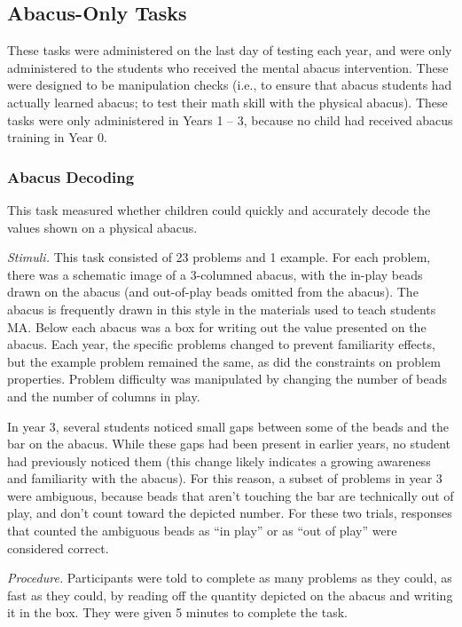 \documentclass[11pt]{article}
\begin{document}
\subsection{Abacus-Only Tasks}

These tasks were administered on the last day of testing each year, and were only administered to the students who received the mental abacus intervention. These were designed to be manipulation checks (i.e., to ensure that abacus students had actually learned abacus; to test their math skill with the physical abacus). These tasks were only administered in Years 1 -- 3, because no child had received abacus training in Year 0.
 
\subsubsection{Abacus Decoding}

This task measured whether children could quickly and accurately decode the values shown on a physical abacus.

{\it Stimuli.} This task consisted of 23 problems and 1 example. For each problem, there was a schematic image of a 3-columned abacus, with the in-play beads drawn on the abacus (and out-of-play beads omitted from the abacus). The abacus is frequently drawn in this style in the materials used to teach students MA. Below each abacus was a box for writing out the value presented on the abacus. Each year, the specific problems changed to prevent familiarity effects, but the example problem remained the same, as did the constraints on problem properties. Problem difficulty was manipulated by changing the number of beads and the number of columns in play. 

In year 3, several students noticed small gaps between some of the beads and the bar on the abacus. While these gaps had been present in earlier years, no student had previously noticed them (this change likely indicates a growing awareness and familiarity with the abacus). For this reason, a subset of problems in year 3 were ambiguous, because beads that aren't touching the bar are technically out of play, and don't count toward the depicted number. For these two trials, responses that counted the ambiguous beads as ``in play'' or as ``out of play'' were considered correct. 

{\it Procedure.} Participants were told to complete as many problems as they could, as fast as they could, by reading off the quantity depicted on the abacus and writing it in the box. They were given 5 minutes to complete the task.
\end{document}
